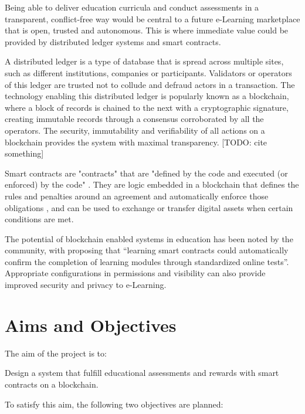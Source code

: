 Being able to deliver education curricula and conduct assessments in a transparent, conflict-free way would be central to 
a future e-Learning marketplace that is open, trusted and autonomous.
This is where immediate value could be provided by distributed ledger systems and smart contracts.

A distributed ledger is a type of database that is spread across multiple sites, such as different institutions, companies 
or participants. Validators or operators of this ledger are trusted not to collude and defraud actors in a transaction. 
The technology enabling this distributed ledger is popularly known as a blockchain, where a block of records is chained to 
the next with a cryptographic signature, creating immutable records through a consensus corroborated by all the operators. 
\citep[p.17]{walport2016distributed}
The security, immutability and verifiability of all actions on a blockchain provides the system with maximal transparency.
[TODO: cite something]

Smart contracts are "contracts" that are "defined by the code and executed (or enforced) by the code" \citep[p.16]{swan2015blockchain}.
They are logic embedded in a blockchain that defines the rules and penalties around an agreement and automatically enforce 
those obligations \citep{gulhane2017ibm}, and can be used to exchange or transfer digital assets when certain conditions are met. 

The potential of blockchain enabled systems in education has been noted by the community, with \citet[p.62]{swan2015blockchain} 
proposing that “learning smart contracts could automatically confirm the completion of learning modules through standardized 
online tests”. Appropriate configurations in permissions and visibility can also provide improved security and privacy to e-Learning.

\section{Aims and Objectives} %

The aim of the project is to:

Design a system that fulfill educational assessments and rewards with smart contracts on a blockchain.

To satisfy this aim, the following two objectives are planned:

